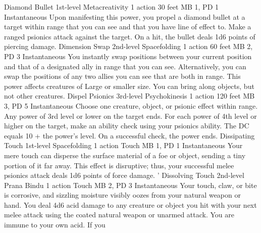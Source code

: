 \DndPowerHeader%
    {Diamond Bullet\label{pwr:diamond_bullet}}
    {1st-level Metacreativity}
    {1 action}
    {30 feet}
    {MB 1, PD 1}
    {Instantaneous}
Upon manifesting this power, you propel a
diamond bullet at a target within range that you can see and
that you have line of effect to. Make a ranged psionics attack
against the target. On a hit, the bullet deals 1d6 points
of piercing damage.
\DndPowerHeader%
    {Dimension Swap\label{pwr:dimension_swap}}
    {2nd-level Spacefolding}
    {1 action}
    {60 feet}
    {MB 2, PD 3}
    {Instantaneous}
You instantly swap positions between your
current position and that of a designated ally in range that
you can see. Alternatively, you can swap the positions of
any two allies you can see that are both in range. This power
affects creatures of Large or smaller size. You can bring
along objects, but not other creatures.
\DndPowerHeader%
    {Dispel Psionics\label{pwr:dispel_psionics}}
    {3rd-level Psychokinesis}
    {1 action}
    {120 feet}
    {MB 3, PD 5}
    {Instantaneous}
Choose one creature, object, or psionic effect
within range. Any power of 3rd level or lower on the target
ends. For each power of 4th level or higher on the target,
make an ability check using your psionics ability. The DC
equals 10 + the power's level. On a successful check, the
power ends.
\DndPowerHeader%
    {Dissipating Touch\label{pwr:dissipating_touch}}
    {1st-level Spacefolding}
    {1 action}
    {Touch}
    {MB 1, PD 1}
    {Instantaneous}
Your mere touch can disperse the surface
material of a foe or object, sending a tiny portion of it
far away. This effect is disruptive; thus, your successful
melee psionics attack deals 1d6 points of force damage. '
\DndPowerHeader%
    {Dissolving Touch\label{pwr:dissolving_touch}}
    {2nd-level Prana Bindu}
    {1 action}
    {Touch}
    {MB 2, PD 3}
    {Instantaneous}
Your touch, claw, or bite is corrosive, and
sizzling moisture visibly oozes from your natural weapon or
hand. You deal 4d6 acid damage to any creature or object you
hit with your next melee attack using the coated natural weapon
or unarmed attack. You are immune to your own acid. If you
